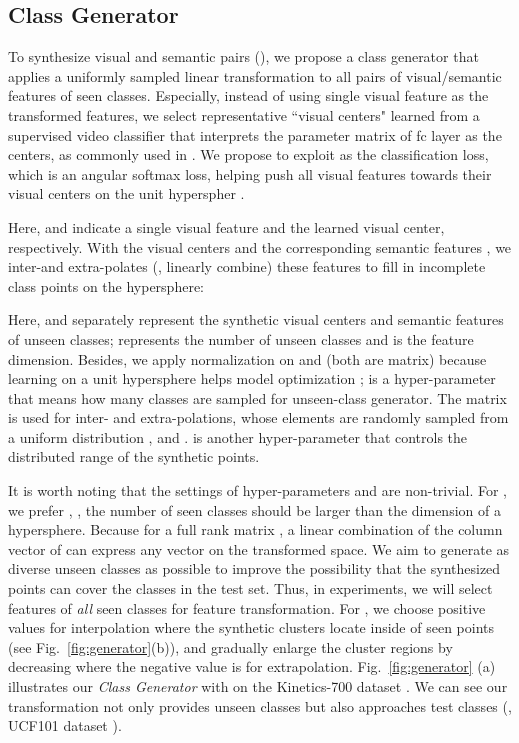 \documentclass[10pt,twocolumn,letterpaper]{article}
\begin{document}
\subsection{Class Generator}
To synthesize visual and semantic pairs (), we propose a class generator that applies a uniformly sampled linear transformation to all pairs of visual/semantic features of seen classes.
Especially, instead of using single visual feature as the transformed features, we select representative ``visual centers" learned from a supervised video classifier that interprets the parameter matrix of fc layer as the centers, as commonly used in \cite{wang2017normface,wang2018additive,du2019explicit,press2016using}.
We propose to exploit  as the classification loss, which is an angular softmax loss, helping push all visual features towards their visual centers on the unit hyperspher \cite{Deepcosine}. 

Here,  and  indicate a single visual feature and the learned visual center, respectively.  
With the visual centers  and the corresponding semantic features , we inter-and extra-polates (\ie, linearly combine) these features to fill in incomplete class points on the hypersphere:

Here,  and   separately represent the synthetic visual centers and semantic features of unseen classes;
 represents the number of unseen classes and  is the feature dimension.
Besides, we apply normalization on  and  (both are  matrix) because learning on a unit hypersphere helps model optimization \cite{wang2020understanding};
 is a hyper-parameter that means how many classes are sampled for unseen-class generator.
The matrix  is used for inter- and extra-polations, whose elements are randomly sampled from a uniform distribution , and .
 is another hyper-parameter that controls the distributed range of the synthetic points.


It is worth noting that the settings of hyper-parameters  and  are non-trivial.
For , we prefer , \ie, the number of seen classes should be larger than the dimension of a hypersphere.
Because for a full rank matrix , a linear combination of the column vector of  can express any vector on the transformed space.
We aim to generate as diverse unseen classes as possible to improve the possibility that the synthesized points can cover the classes in the test set. 
Thus, in experiments, we will select features of {\em all} seen classes for feature transformation. 
For , we choose positive values for interpolation where the synthetic clusters locate inside of seen points (see Fig.~\ref{fig:generator}(b)), and gradually enlarge the cluster regions by decreasing  where the negative value is for extrapolation.
Fig.~\ref{fig:generator} (a) illustrates our {\em Class Generator} with  on the Kinetics-700 dataset \cite{kay2017kinetics}.
We can see our transformation not only provides unseen classes but also approaches test classes (\eg, UCF101 dataset \cite{soomro2012dataset}).
\end{document}
